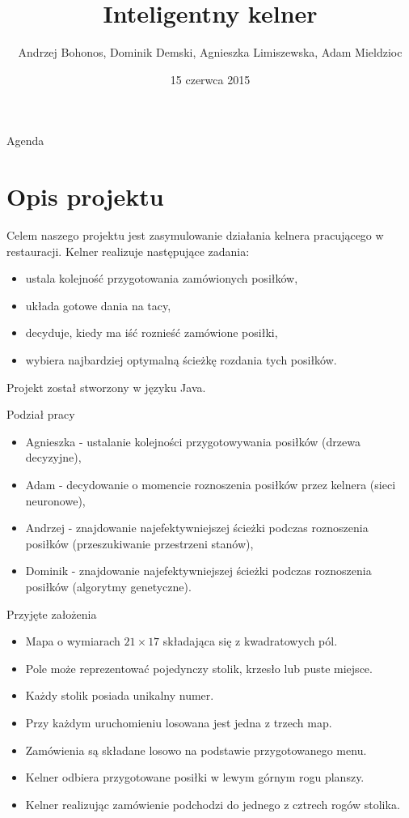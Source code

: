 \documentclass[a4paper,10pt]{beamer}
\date{15 czerwca 2015}
\title{Inteligentny kelner}
\author[A. Bohonos, D. Demski, A. Limiszewska, A. Mieldzioc]{Andrzej Bohonos, Dominik Demski, Agnieszka Limiszewska, Adam Mieldzioc}
\begin{document}
		\begin{frame}
			\titlepage
		\end{frame}
		\begin{frame}{Agenda}
			\tableofcontents
		\end{frame}
		
		\section{Opis projektu}
		\begin{frame}
			Celem naszego projektu jest zasymulowanie działania kelnera pracującego w restauracji. Kelner realizuje następujące zadania:
			\begin{itemize}
				\item ustala kolejność przygotowania zamówionych posiłków,
				\item układa gotowe dania na tacy, 
				\item decyduje, kiedy ma iść roznieść zamówione posiłki,
				\item wybiera najbardziej optymalną ścieżkę rozdania tych posiłków. 
			\end{itemize}
			Projekt został stworzony w języku Java.
		\end{frame}
		\begin{frame}{Podział pracy}
			\begin{itemize}
				\item Agnieszka - ustalanie kolejności przygotowywania posiłków (drzewa decyzyjne),
				\item Adam - decydowanie o momencie roznoszenia posiłków przez kelnera (sieci neuronowe),
				\item Andrzej - znajdowanie najefektywniejszej ścieżki podczas roznoszenia posiłków (przeszukiwanie przestrzeni stanów),
				\item Dominik - znajdowanie najefektywniejszej ścieżki podczas roznoszenia posiłków (algorytmy genetyczne).
			\end{itemize}
		\end{frame}
		\begin{frame}{Przyjęte założenia}
			\begin{itemize}
				\item Mapa o wymiarach $21\times17$ składająca się z kwadratowych pól. 
				\item Pole może reprezentować pojedynczy stolik, krzesło lub puste miejsce.
				\item Każdy stolik posiada unikalny numer.
				\item Przy każdym uruchomieniu losowana jest jedna z trzech map.
				\item Zamówienia są składane losowo na podstawie przygotowanego menu.
				\item Kelner odbiera przygotowane posiłki w lewym górnym rogu planszy.
				\item Kelner realizując zamówienie podchodzi do jednego z cztrech rogów stolika.
				
			\end{itemize}
		\end{frame}
		
\end{document}
